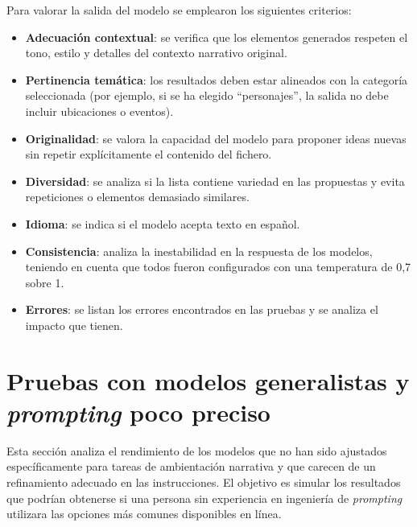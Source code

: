 Para valorar la salida del modelo se emplearon los siguientes criterios:
\begin{itemize}
\item \textbf{Adecuación contextual}: se verifica que los elementos generados respeten el tono, estilo y detalles del contexto narrativo original.
\item \textbf{Pertinencia temática}: los resultados deben estar alineados con la categoría seleccionada
(por ejemplo, si se ha elegido ``personajes'', la salida no debe incluir ubicaciones o eventos).
\item \textbf{Originalidad}: se valora la capacidad del modelo para proponer ideas nuevas sin repetir explícitamente el contenido del fichero.
\item \textbf{Diversidad}: se analiza si la lista contiene variedad en las propuestas y evita repeticiones o elementos demasiado similares.
\item \textbf{Idioma}: se indica si el modelo acepta texto en español. 
\item \textbf{Consistencia}: analiza la inestabilidad en la respuesta de los modelos,
teniendo en cuenta que todos fueron configurados con una temperatura de 0,7 sobre 1. 
\item \textbf{Errores}: se listan los errores encontrados en las pruebas y se analiza el impacto que tienen.
\end{itemize}

\section{Pruebas con modelos generalistas y \textit{prompting} poco preciso}
Esta sección analiza el rendimiento de los modelos que no han sido ajustados específicamente
para tareas de ambientación narrativa y que carecen de un refinamiento adecuado en las instrucciones.
El objetivo es simular los resultados que podrían obtenerse si una persona sin experiencia en ingeniería de
\textit{prompting} utilizara las opciones más comunes disponibles en línea.

